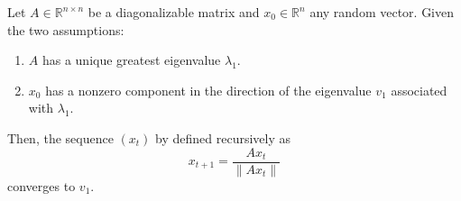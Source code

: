   \begin{theorem}
    Let $A \in \mathbb{R}^{n \times n}$ be a diagonalizable matrix and $x_0 \in \mathbb{R}^n$ any random vector. Given the two assumptions: 
    \begin{enumerate}
      \item $A$ has a unique greatest eigenvalue $\lambda_1$. 
      \item $x_0$ has a nonzero component in the direction of the eigenvalue $v_1$ associated with $\lambda_1$. 
    \end{enumerate}
    Then, the sequence $(x_t)$ by defined recursively as
    \begin{equation} 
      x_{t+1} = \frac{A x_t}{\|A x_t\|}
    \end{equation}
    converges to $v_1$. 
  \end{theorem}
